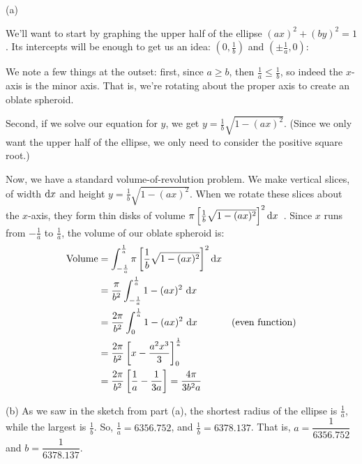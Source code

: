 \begin{solution}
(a)

We'll want to start by graphing the upper half of the ellipse $(ax)^2+(by)^2=1$. Its intercepts will be enough to get us an idea: $(0,\frac{1}{b})$ and $(\pm\frac{1}{a},0)$:
\begin{center}
\end{center}

We note a few things at the outset: first, since $a \geq b$, then $\frac{1}{a} \leq \frac{1}{b}$, so indeed the $x$-axis is the minor axis. That is, we're rotating about the proper axis to create an oblate spheroid.

Second, if we solve our equation for $y$, we get $y=\frac{1}{b}\sqrt{1-(ax)^2}$. (Since we only want the upper half of the ellipse, we only need to consider the positive square root.)

Now, we have a standard volume-of-revolution problem. We make vertical slices, of width $\mathrm{d}x$ and height $y=\frac{1}{b}\sqrt{1-(ax)^2}$. When we rotate these slices about the $x$-axis, they form thin disks of volume $\pi\left[\frac{1}{b}\sqrt{1-(ax)^2}\right]^2\mathrm{d}x$\ . Since $x$ runs from $-\frac{1}{a}$ to $\frac{1}{a}$, the volume of our oblate spheroid is:
\begin{align*}
\mbox{Volume}&=\int_{-\frac{1}{a}}^{\frac{1}{a}} \pi \left[\frac{1}{b}\sqrt{1-(ax)^2}\right]^2\dee{x}\\
&=\frac{\pi}{b^2}\int_{-\frac{1}{a}}^{\frac{1}{a}} 1-(ax)^2\ \dee{x}\\
&=\frac{2\pi}{b^2}\int_{0}^{\frac{1}{a}} 1-(ax)^2\ \dee{x}&\mbox{(even function)}\\
&=\frac{2\pi}{b^2}\left[x - \frac{a^2x^3}{3}\right]_{0}^{\frac{1}{a}}\\
&=\frac{2\pi}{b^2}\left[\frac{1}{a} - \frac{1}{3a} \right] = \frac{4\pi}{3b^2a}
\end{align*}

(b) As we saw in the sketch from part (a), the shortest radius of the ellipse is $\frac{1}{a}$, while the largest is $\frac{1}{b}$. So, $\frac{1}{a} = 6356.752$, and $\frac{1}{b} = 6378.137$. That is, $a = \dfrac{1}{6356.752}$ and $b=\dfrac{1}{6378.137}$.


\end{solution}
